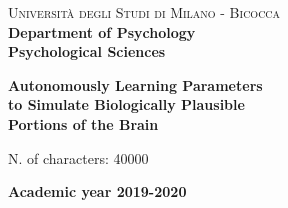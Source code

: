 \begin{titlepage}
	
	\noindent
	\begin{minipage}[t]{0.19\textwidth}
	\end{minipage}
	\begin{minipage}[t]{0.81\textwidth}
	{
			{\textsc{Università degli Studi di Milano - Bicocca}} \\
			\textbf{Department of Psychology} \\
			\textbf{Psychological Sciences} \\
			\par
	}
	\end{minipage}
	
\vspace{40mm}
	
\begin{center}
		{\LARGE{
				\textbf{Autonomously Learning Parameters \\ to Simulate Biologically Plausible \\ Portions of the Brain}
				\par
		}}
	\end{center}
	
	\vspace{30mm}

	\noindent

	\vspace{15mm}

	\begin{flushright}
		\large{N. of characters: 40000}
	\end{flushright}
	
	\vspace{30mm}
	\begin{center}
		{\large{\bf Academic year 2019-2020}}
	\end{center}

	\restoregeometry
	
\end{titlepage}
